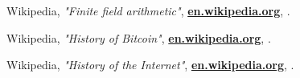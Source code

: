 \documentclass[10pt,a4paper,final]{article}
\let\oldhref\href
\renewcommand{\href}[2]{\oldhref{#1}{\bfseries#2}}
\begin{document}
\begin{thebibliography}{999}
	Wikipedia,
	\emph{"Finite field arithmetic"},
	\href{https://en.wikipedia.org/wiki/Finite_field_arithmetic}{en.wikipedia.org},
	\the\year{}.

	Wikipedia,
	\emph{"History of Bitcoin"},
	\href{https://en.wikipedia.org/wiki/History_of_bitcoin}{en.wikipedia.org},
	\the\year{}.

	Wikipedia,
	\emph{"History of the Internet"},
	\href{https://en.wikipedia.org/wiki/History_of_the_Internet}{en.wikipedia.org},
	\the\year{}.

\end{thebibliography}

\clearpage
\printglossaries
\end{document}
